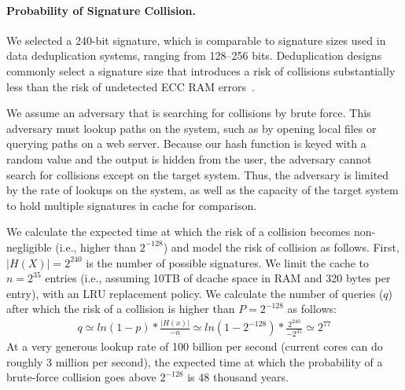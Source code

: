 

\paragraph{Probability of Signature Collision.}
We selected a 240-bit signature, 
which is comparable to signature sizes used in data 
deduplication systems, ranging from 128--256 bits.  Deduplication designs commonly 
select a signature size that introduces a
risk of collisions substantially less than the risk of undetected ECC RAM 
errors~\citep{Debnath:2010:CSU:1855840.1855856, Srinivasan:2012:ILI:2208461.2208485, Quinlan:2002:VNA:645371.651321, Zhu:2008:ADB:1364813.1364831}.

We assume an adversary that is searching for collisions by brute force.
This adversary must lookup paths on the system,
such as by opening local files or querying paths on a web server.
Because our hash function is keyed with a random value and the output is 
hidden from the user,
the adversary cannot search for collisions except on the target system.
Thus, the adversary is limited by the rate of lookups on the system,
as well as the capacity of the target system to hold multiple signatures
in cache for comparison.

We calculate the expected time 
at which the risk of a collision becomes non-negligible (i.e., higher than $2^{-128}$) 
and model the risk of collision as follows.
First, $|H(X)|=2^{240}$ is
the number of possible signatures.
We  limit the cache to $n=2^{35}$ entries (i.e., assuming 10TB of dcache space in RAM and 320 bytes per entry),
with an LRU replacement policy.
We calculate the number of queries ($q$) after which the risk of a collision is 
higher than $P=2^{-128}$ as follows:
\begin{align*}
q \simeq ln(1 - p) * \frac{|H(x)|}{-n} \simeq ln(1-2^{-128}) * \frac{2^{240}}{-2^{35}} \simeq 2^{77}
\end{align*}
At a very generous 
lookup rate of 100 billion per second (current cores can
do roughly 3 million per second),
the expected time 
at which the probability of a brute-force collision goes above $2^{-128}$
is 48 thousand years.


